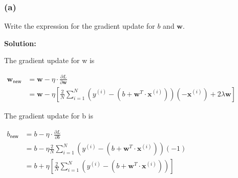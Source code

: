 \documentclass[11pt]{article}
\begin{document}
\begin{algorithmic}[h]
	
		
		
		

	
	\EndFor
	
	\EndFunction
	
\end{algorithmic}

\subsubsection*{(a)}
	Write the expression for the gradient update for $b$ and $\mathbf{w}$.
	
	{\noindent \bf Solution: 
	
	
	
The gradient update for w is	

        $\begin{aligned}
	        \mathbf{w}_{\mathsf{new}}&=\mathbf{w}- \eta \cdot \frac{\partial L }{\partial \mathbf{w}}\\
	        &=\mathbf{w}-\eta\left[\frac{2}{N} \sum\limits_{i = 1}^N (y^{(i)} - ( b + \mathbf{w}^T \cdot \mathbf{x}^{(i)}))(-\mathbf{x}^{(i)})+2\lambda\mathbf{w}\right]
	    \end{aligned}$
    
The gradient update for b is  
    
        $\begin{aligned}
	        b_{\mathsf{new}}&=b- \eta \cdot \frac{\partial L }{\partial b}\\
	        &=b
	        -\eta\frac{2}{N} \sum\limits_{i = 1}^N (y^{(i)} - ( b + \mathbf{w}^T \cdot \mathbf{x}^{(i)}))(-1)\\
	        &=b
	        +\eta\left[\frac{2}{N} \sum\limits_{i = 1}^N (y^{(i)} - ( b + \mathbf{w}^T \cdot \mathbf{x}^{(i)}))\right]
	    \end{aligned}$
	
    
	

	}
	
\end{document}
